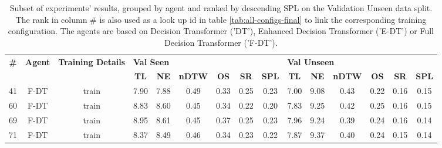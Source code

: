 \begin{table}
\centering
\caption{\label{tab:full_dt_ablation_dim}Subset of experiments' results, grouped by agent and ranked by descending SPL on the Validation Unseen data split. The rank in column \# is also used as a look up id in table \ref{tab:all-configs-final} to link the corresponding training configuration.     \newline The agents are based on Decision Transformer ('DT'), Enhanced Decision Transformer ('E-DT') or Full Decision Transformer ('F-DT').}
\begin{tabular}{@{\hskip3pt}c@{\hskip3pt}c@{\hskip3pt}c@{\hskip3pt}c@{\hskip3pt}c@{\hskip3pt}c@{\hskip3pt}c@{\hskip3pt}c@{\hskip3pt}c@{\hskip3pt}c@{\hskip3pt}c@{\hskip3pt}c@{\hskip3pt}c@{\hskip3pt}c@{\hskip3pt}c}
\toprule
\textbf{\#} & \textbf{Agent} & \textbf{Training Details} & \multicolumn{6}{l}{\textbf{Val Seen}} & \multicolumn{6}{l}{\textbf{Val Unseen}} \\
 \textbf{~} &     \textbf{~} &                \textbf{~} &       \textbf{TL} & \textbf{NE} & \textbf{nDTW} & \textbf{OS} & \textbf{SR} & \textbf{SPL} &         \textbf{TL} & \textbf{NE} & \textbf{nDTW} & \textbf{OS} & \textbf{SR} & \textbf{SPL} \\
\midrule
         41 &           F-DT &                     train &              7.90 &        7.88 &          0.49 &        0.33 &        0.25 &         0.23 &                7.00 &        9.08 &          0.43 &        0.22 &        0.16 &         0.15 \\
         60 &           F-DT &                     train &              8.83 &        8.60 &          0.45 &        0.34 &        0.22 &         0.20 &                7.83 &        9.25 &          0.42 &        0.25 &        0.16 &         0.15 \\
         69 &           F-DT &                     train &              8.95 &        8.61 &          0.45 &        0.37 &        0.25 &         0.23 &                7.96 &        9.24 &          0.39 &        0.24 &        0.16 &         0.14 \\
         71 &           F-DT &                     train &              8.37 &        8.49 &          0.46 &        0.34 &        0.23 &         0.22 &                7.87 &        9.37 &          0.40 &        0.24 &        0.15 &         0.14 \\
\bottomrule
\end{tabular}
\end{table}
